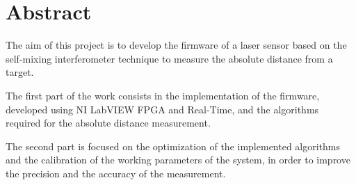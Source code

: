 \newpage
\chapter*{Abstract}

The aim of this project is to develop the firmware of a laser sensor based on the self-mixing interferometer technique to measure the absolute distance from a target.

The first part of the work consists in the implementation of the firmware, developed using NI LabVIEW FPGA and Real-Time, and the algorithms required for the absolute distance measurement.

The second part is focused on the optimization of the implemented algorithms and the calibration of the working parameters of the system, in order to improve the precision and the accuracy of the measurement.